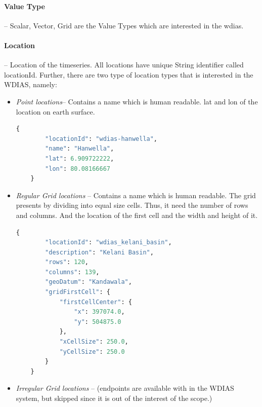 \paragraph{Value Type}-- Scalar, Vector, Grid are the Value Types which are interested in the \acrshort{wdias}.

\paragraph{Location}-- Location of the timeseries. All locations have unique String identifier called locationId. Further, there are two type of location types that is interested in the WDIAS, namely:
\begin{itemize}
  \item \emph{Point locations}-- Contains a name which is human readable. lat and lon of the location on earth surface.
  \begin{lstlisting}[language=Python]
    {
        "locationId": "wdias-hanwella",
        "name": "Hanwella",
        "lat": 6.909722222,
        "lon": 80.08166667
    }
  \end{lstlisting}
  \item \emph{Regular Grid locations} -- Contains a name which is human readable. The grid presents by dividing into equal size cells. Thus, it need the number of rows and columns. 
  And the location of the first cell and the width and height of it.
  \begin{lstlisting}[language=Python]
      {
        "locationId": "wdias_kelani_basin",
        "description": "Kelani Basin",
        "rows": 120,
        "columns": 139,
        "geoDatum": "Kandawala",
        "gridFirstCell": {
            "firstCellCenter": {
                "x": 397074.0,
                "y": 504875.0
            },
            "xCellSize": 250.0,
            "yCellSize": 250.0
        }
    }
  \end{lstlisting}
  \item \emph{Irregular Grid locations} -- (endpoints are available with in the WDIAS system, but skipped since it is out of the interest of the scope.)
\end{itemize}


